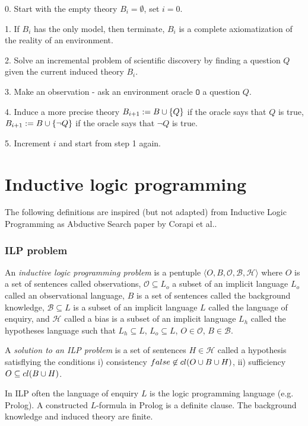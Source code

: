 0. Start with the empty theory $B_i=\emptyset$, set $i=0$.

1. If $B_i$ has the only model, then terminate, $B_i$ is a complete axiomatization of the reality of an environment.

2. Solve an incremental problem of scientific discovery by finding a question $Q$ given the current induced theory $B_i$.

3. Make an observation - ask an environment oracle $\mathtt{O}$ a question $Q$.

4. Induce a more precise theory $B_{i+1}:=B \cup \{Q\}$ if the oracle says that $Q$ is true, $B_{i+1}:=B \cup \{\neg Q\}$ if the oracle says that $\neg Q$ is true.

5. Increment $i$ and start from step 1 again.

\chapter{Inductive logic programming}
The following definitions are inspired (but not adapted) from Inductive Logic Programming as Abductive Search paper by Corapi et al.\cite{corapi2010}.

\subsection{ILP problem}

\begin{defn}\cite{corapi2010}
An \emph{inductive logic programming problem} is a pentuple $\langle O, B, \mathcal{O}, \mathcal{B}, \mathcal{H} \rangle$ where $O$ is a set of sentences called observations, $\mathcal{O} \subseteq L_o$ a subset of an implicit language $L_o$ called an observational language, $B$ is a set of sentences called the background knowledge, $\mathcal{B} \subseteq L$ is a subset of an implicit language $L$ called the language of enquiry, and $\mathcal{H}$ called a bias is a subset of an implicit language $L_h$ called the hypotheses language such that $L_h \subseteq L$, $L_o \subseteq L$, $O \in \mathcal{O}$, $B \in \mathcal{B}$.

A \emph{solution to an ILP problem} is a set of sentences $H \in \mathcal{H}$ called a hypothesis satisflying the conditions
i) consistency $false \not \in cl(O \cup B \cup H)$,
ii) sufficiency $O \subseteq cl(B \cup H)$.
\end{defn}

In ILP often the language of enquiry $L$ is the logic programming language (e.g. Prolog). A constructed $L$-formula in Prolog is a definite clause. The background knowledge and induced theory are finite.

